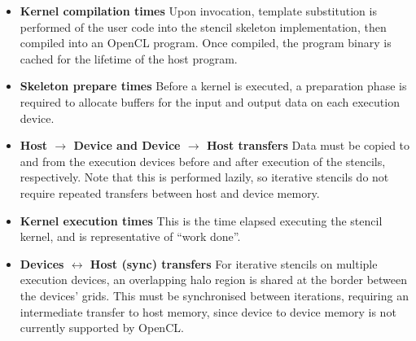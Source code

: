 \begin{itemize}
\item \textbf{Kernel compilation times} Upon invocation, template
  substitution is performed of the user code into the stencil skeleton
  implementation, then compiled into an OpenCL program. Once compiled,
  the program binary is cached for the lifetime of the host program.
\item \textbf{Skeleton prepare times} Before a kernel is executed, a
  preparation phase is required to allocate buffers for the input and
  output data on each execution device.
\item \textbf{Host $\rightarrow$ Device and Device $\rightarrow$ Host
    transfers} Data must be copied to and from the execution devices
  before and after execution of the stencils, respectively. Note that
  this is performed lazily, so iterative stencils do not require
  repeated transfers between host and device memory.
\item \textbf{Kernel execution times} This is the time elapsed
  executing the stencil kernel, and is representative of ``work
  done''.
\item \textbf{Devices $\leftrightarrow$ Host (sync) transfers} For
  iterative stencils on multiple execution devices, an overlapping
  halo region is shared at the border between the devices' grids. This
  must be synchronised between iterations, requiring an intermediate
  transfer to host memory, since device to device memory is not
  currently supported by OpenCL.
\end{itemize}

